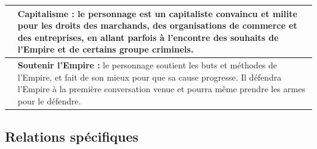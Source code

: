 \documentclass[twoside]{article}
\begin{document}
\begin{table}[h]
\begin{tabular}{|m{2cm}|m{13cm}|}
		\hline
		\centering{81 -- 90} & \textbf{Capitalisme :} le personnage est un capitaliste convaincu et milite pour les droits des marchands, des organisations de commerce et des entreprises, en allant parfois à l'encontre des souhaits de l'Empire et de certains groupe criminels. \\
		\hline
		\centering{91 -- 00} & \textbf{Soutenir l'Empire :} le personnage soutient les buts et méthodes de l'Empire, et fait de son mieux pour que sa cause progresse. Il défendra l'Empire à la première conversation venue et pourra même prendre les armes pour le défendre. \\
		\hline
	\end{tabular}
\end{table}


\subsection*{Relations spécifiques}
\end{document}
